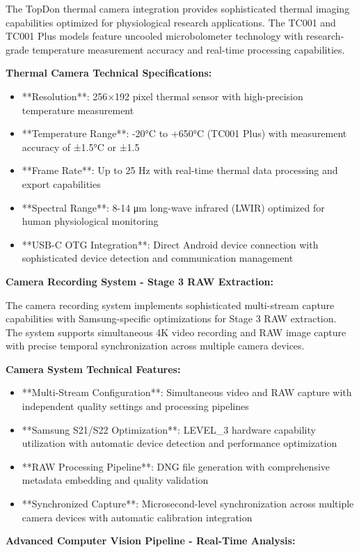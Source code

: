 \documentclass[11pt,a4paper]{report}
\begin{document}
The TopDon thermal camera integration provides sophisticated thermal imaging capabilities optimized for physiological
research applications. The TC001 and TC001 Plus models feature uncooled microbolometer technology with research-grade
temperature measurement accuracy and real-time processing capabilities.

\textbf{Thermal Camera Technical Specifications:}

\begin{itemize}
\item **Resolution**: 256×192 pixel thermal sensor with high-precision temperature measurement
\item **Temperature Range**: -20°C to +650°C (TC001 Plus) with measurement accuracy of ±1.5°C or ±1.5%
\item **Frame Rate**: Up to 25 Hz with real-time thermal data processing and export capabilities
\item **Spectral Range**: 8-14 μm long-wave infrared (LWIR) optimized for human physiological monitoring
\item **USB-C OTG Integration**: Direct Android device connection with sophisticated device detection and communication
  management

\end{itemize}
\textbf{Camera Recording System - Stage 3 RAW Extraction:}

The camera recording system implements sophisticated multi-stream capture capabilities with Samsung-specific
optimizations for Stage 3 RAW extraction. The system supports simultaneous 4K video recording and RAW image capture with
precise temporal synchronization across multiple camera devices.

\textbf{Camera System Technical Features:}

\begin{itemize}
\item **Multi-Stream Configuration**: Simultaneous video and RAW capture with independent quality settings and processing
  pipelines
\item **Samsung S21/S22 Optimization**: LEVEL_3 hardware capability utilization with automatic device detection and
  performance optimization
\item **RAW Processing Pipeline**: DNG file generation with comprehensive metadata embedding and quality validation
\item **Synchronized Capture**: Microsecond-level synchronization across multiple camera devices with automatic calibration
  integration

\end{itemize}
\textbf{Advanced Computer Vision Pipeline - Real-Time Analysis:}
\end{document}
